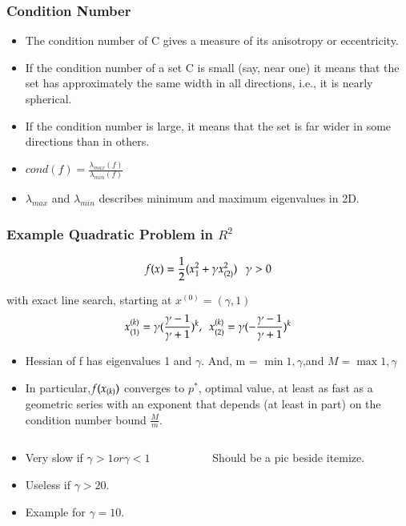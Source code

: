 \begin{frame}
\frametitle{Condition Number}
\begin{itemize}
\item The condition number of C gives a measure of its anisotropy or
  eccentricity.
\item If the condition number of a set C is small (say, near one) it
  means that the set has approximately the same width in all
  directions, i.e., it is nearly spherical.
\item If the condition number is large, it means that the set is far
  wider in some directions than in others.
\item $cond(f) = \frac{\lambda_{max}(f)}{\lambda_{min}(f)}$
\item $\lambda_{max}$ and $\lambda_{min}$ describes minimum and maximum eigenvalues in 2D.
\end{itemize}
\end{frame}

\begin{frame}
  \frametitle{Example Quadratic Problem in $R^2$}

{
\tiny

$$f(x) = \frac{1}{2}(x_1^2 + \gamma x_{(2)}^2) ~~~ \gamma > 0$$

with exact line search, starting at $x^{(0)} = (\gamma, 1)$
$$x_{(1)}^{(k)} = \gamma (\frac{\gamma - 1}{\gamma + 1})^k, ~~
x_{(2)}^{(k)} = \gamma (-\frac{\gamma - 1}{\gamma + 1})^k$$
}
\vspace{-8mm}

{
\tiny
\begin{itemize}
\item Hessian of f has eigenvalues 1 and $\gamma$. And, m = $\min{1,
    \gamma}$,and $M = \max{1, \gamma}$
\item In particular,$f(x_{(k)})$ converges to $p^*$, optimal value, at
  least as fast as a geometric series with an exponent that depends
  (at least in part) on the condition number bound $\frac{M}{m}$.

\end{itemize}


}
\begin{columns}

  \begin{column}{0.6\textwidth}


\begin{itemize}
\item Very slow if $\gamma > 1 or \gamma < 1$
\item Useless if $\gamma > 20$.
\item Example for $\gamma = 10$.
\end{itemize}
\end{column}

\begin{column}{0.5\textwidth}
Should be a pic beside itemize.
\end{column}


\end{columns}
\end{frame}


